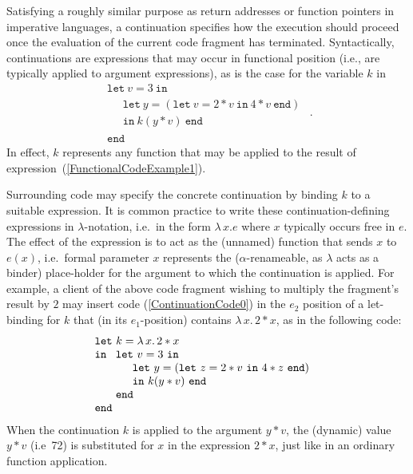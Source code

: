 Satisfying a roughly similar purpose as return addresses or function
pointers in imperative languages, a continuation specifies how the
execution should proceed once the evaluation of the current code
fragment has terminated. Syntactically, continuations are expressions
that may occur in functional position (i.e., are typically applied to
argument expressions), as is the case for the variable $k$ in
\begin{equation}
\label{ContinuationCode0}
\begin{array}{l}
  \mathtt{let}\ v = 3\ \mathtt{in}\\
  \quad \begin{array}{l} 
    \mathtt{let}\ y = (\mathtt{let}\ v=2*v \ \mathtt{in}\ 4*v\ \mathtt{end})\\
    \mathtt{in}\ k (y*v)\ \mathtt{end}
  \end{array}\\
  \mathtt{end}
  \end{array}.
\end{equation}
In effect, $k$ represents any function that may be applied to the
result of expression~(\ref{FunctionalCodeExample1}).

Surrounding code may specify the concrete continuation by binding $k$
to a suitable expression. It is common practice to write these
continuation-defining expressions in $\lambda$-notation, i.e.~in the
form $\lambda\, x. e$ where $x$ typically occurs free in $e$. The
effect of the expression is to act as the (unnamed) function that
sends $x$ to $e(x)$, i.e.~formal parameter $x$ represents the
($\alpha$-renameable, as $\lambda$ acts as a binder) place-holder for
the argument to which the continuation is applied. For example, a
client of the above code fragment wishing to multiply the fragment's
result by $2$ may insert code (\ref{ContinuationCode0}) in the $e_2$
position of a let-binding for $k$ that (in its $e_1$-position)
contains $\lambda\, x .\, 2* x$, as in the following code:
$$\begin{array}{l}
\mathtt{let}\ k = \lambda\, x .\, 2* x\\ 
\mathtt{in}\ 
  \begin{array}[t]{l}
    \mathtt{let}\ v = 3\ \mathtt{in}\\
    \quad \begin{array}{l} 
      \mathtt{let}\ y = (\mathtt{let}\ z=2*v \ \mathtt{in}\ 4*z\ \mathtt{end})\\
      \mathtt{in}\ k (y*v)\ \mathtt{end}
    \end{array}\\
    \mathtt{end}
  \end{array}\\ 
\mathtt{end}
\end{array}
$$ 
When the continuation $k$ is applied to the argument $y*v$, the
(dynamic) value $y*v$ (i.e~72) is substituted for $x$ in the
expression $2*x$, just like in an ordinary function application.

